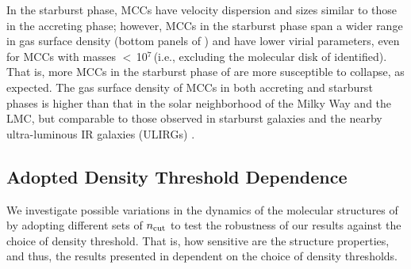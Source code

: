 \IfFileExists{emulateapjlegacy.cls}{\documentclass[iop]{emulateapjlegacy}}{\documentclass[iop]{emulateapj}}
\begin{document}
In the starburst phase, MCCs have velocity dispersion and sizes similar to those in the accreting phase; however, 
MCCs in the starburst phase span a wider range in gas surface density 
(bottom panels of ) and have lower virial parameters, even
for MCCs with masses $<$\,10$^7$\,\Msun (i.e., excluding the molecular disk of \flower identified).
That is, more MCCs in the starburst phase of \flower are more susceptible to collapse, as expected.
The gas surface density of MCCs in both accreting and starburst phases is higher than that in the solar neighborhood
of the Milky Way and the LMC, but comparable to those observed in starburst galaxies and the nearby 
ultra-luminous IR galaxies (ULIRGs) \citep{Boulares90a, Scoville91a, Weiss01a, Hughes10a, Leroy15a}.
%

\subsection{Adopted Density Threshold Dependence}\label{sec:ncut}

We investigate possible variations in the dynamics of the molecular structures of \flower 
by adopting different sets of $n_{\rm cut}$ %
to test the robustness of our results against the choice of density threshold. 
That is, how sensitive are the structure properties, and thus, the 
results presented in  dependent on the choice of density thresholds.
\end{document}
